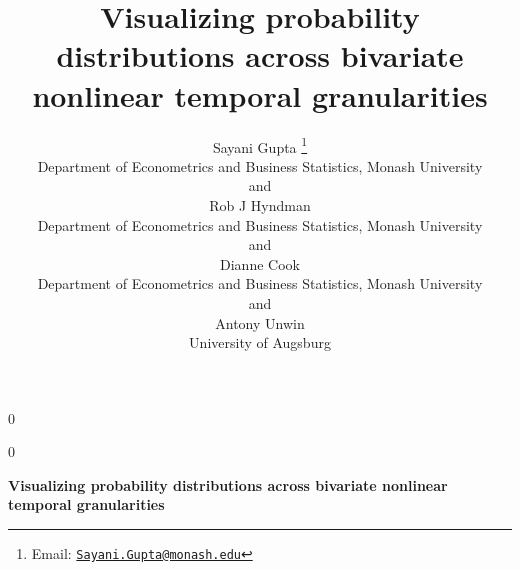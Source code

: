 \documentclass[12pt]{article}
\newcommand{\blind}{0}
\begin{document}
\def\spacingset#1{\renewcommand{\baselinestretch}%
{#1}\small\normalsize} \spacingset{1}



\blind
{
  \title{\bf Visualizing probability distributions across bivariate nonlinear temporal granularities}

  \author{
        Sayani Gupta \thanks{Email: \href{mailto:Sayani.Gupta@monash.edu}{\nolinkurl{Sayani.Gupta@monash.edu}}} \\
    Department of Econometrics and Business Statistics, Monash University\\
     and \\     Rob J Hyndman \\
    Department of Econometrics and Business Statistics, Monash University\\
     and \\     Dianne Cook \\
    Department of Econometrics and Business Statistics, Monash University\\
     and \\     Antony Unwin \\
    University of Augsburg\\
      }
  \maketitle
} \fi

\blind
{
  \bigskip
  \bigskip
  \bigskip
  \begin{center}
    {\LARGE\bf Visualizing probability distributions across bivariate nonlinear temporal granularities}
  \end{center}
  \medskip
} \fi
\end{document}
